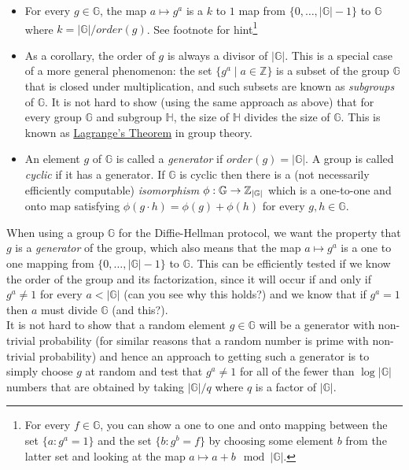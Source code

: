 \begin{itemize}
\item
  For every \(g\in \mathbb{G}\), the map \(a \mapsto g^a\) is a \(k\) to
  \(1\) map from \(\{0,\ldots,|\mathbb{G}|-1\}\) to \(\mathbb{G}\) where
  \(k=|\mathbb{G}|/order(g)\). See footnote for hint\footnote{For every
    \(f\in \mathbb{G}\), you can show a one to one and onto mapping
    between the set \(\{ a : g^a = 1 \}\) and the set
    \(\{b : g^b= f \}\) by choosing some element \(b\) from the latter
    set and looking at the map \(a \mapsto a+b \mod |\mathbb{G}|\).}
\item
  As a corollary, the order of \(g\) is always a divisor of
  \(|\mathbb{G}|\). This is a special case of a more general phenomenon:
  the set \(\{ g^a \;|\; a\in\mathbb{Z} \}\) is a subset of the group
  \(\mathbb{G}\) that is closed under multiplication, and such subsets
  are known as \emph{subgroups} of \(\mathbb{G}\). It is not hard to
  show (using the same approach as above) that for every group
  \(\mathbb{G}\) and subgroup \(\mathbb{H}\), the size of \(\mathbb{H}\)
  divides the size of \(\mathbb{G}\). This is known as
  \href{https://goo.gl/Q9VSqn}{Lagrange's Theorem} in group theory.
\item
  An element \(g\) of \(\mathbb{G}\) is called a \emph{generator} if
  \(order(g)=|\mathbb{G}|\). A group is called \emph{cyclic} if it has a
  generator. If \(\mathbb{G}\) is cyclic then there is a (not
  necessarily efficiently computable) \emph{isomorphism}
  \(\phi:\mathbb{G}\rightarrow{\mathbb{Z}}_{|\mathbb{G}|}\) which is a one-to-one
  and onto map satisfying \(\phi(g\cdot h)=\phi(g)+\phi(h)\) for every
  \(g,h\in\mathbb{G}\).
\end{itemize}

When using a group \(\mathbb{G}\) for the Diffie-Hellman protocol, we
want the property that \(g\) is a \emph{generator} of the group, which
also means that the map \(a \mapsto g^a\) is a one to one mapping from
\(\{0,\ldots,|\mathbb{G}|-1\}\) to \(\mathbb{G}\). This can be
efficiently tested if we know the order of the group and its
factorization, since it will occur if and only if \(g^a \neq 1\) for
every \(a<|\mathbb{G}|\) (can you see why this holds?) and we know that
if \(g^a=1\) then \(a\) must divide \(\mathbb{G}\) (and this?).\\
It is not hard to show that a random element \(g\in \mathbb{G}\) will be
a generator with non-trivial probability (for similar reasons that a
random number is prime with non-trivial probability) and hence an
approach to getting such a generator is to simply choose \(g\) at random
and test that \(g^a \neq 1\) for all of the fewer than
\(\log |\mathbb{G}|\) numbers that are obtained by taking
\(|\mathbb{G}|/q\) where \(q\) is a factor of \(|\mathbb{G}|\).

